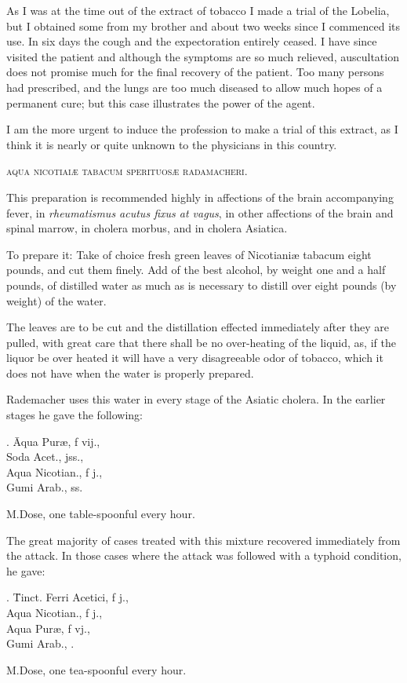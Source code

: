 
As I was at the time out of the extract of tobacco I made a trial of
the Lobelia, but I obtained some from my brother and about two
weeks since I commenced its use. In six days the cough and the expectoration
entirely ceased. I have since visited the patient and although
the symptoms are so much relieved, auscultation does not promise much
for the final recovery of the patient. Too many persons had prescribed,
and the lungs are too much diseased to allow much hopes of a permanent
cure; but this case illustrates the power of the agent.

I am the more urgent to induce the profession to make a trial of
this extract, as I think it is nearly or quite unknown to the physicians
in this country.

\begin{center}\textsc{aqua nicotiaiæ tabacum sperituosæ radamacheri.}\end{center}

This preparation is recommended highly in affections of the brain
accompanying fever, in \emph{rheumatismus acutus fixus at vagus}, in other
affections of the brain and spinal marrow, in cholera morbus, and in
cholera Asiatica.

To prepare it: Take of choice fresh green leaves of Nicotianiæ tabacum
eight pounds, and cut them finely. Add of the best alcohol,
by weight one and a half pounds, of distilled water as much as is
necessary to distill over eight pounds (by weight) of the water.

The leaves are to be cut and the distillation effected immediately
after they are pulled, with great care that there shall be no over-heating
of the liquid, as, if the liquor be over heated it will have a very disagreeable
odor of tobacco, which it does not have when the water is
properly prepared.

Rademacher uses this water in every stage of the Asiatic cholera.
In the earlier stages he gave the following:
  \begin{tabbing}
    \prescription. \= Aqua Puræ, f \ounce vij., \\
      \> Soda Acet., \ounce jss., \\
      \> Aqua Nicotian., f \ounce j., \\
      \> Gumi Arab., \ounce ss. \\
  \end{tabbing}
M.\quad{}Dose, one table-spoonful every hour.


The great majority of cases treated with this mixture recovered
immediately from the attack. In those cases where the attack was followed
with a typhoid condition, he gave:
  \begin{tabbing}
    \prescription. \= Tinct. Ferri Acetici, f \ounce j., \\
      \> Aqua Nicotian., f \ounce j., \\
      \> Aqua Puræ, f \ounce vj., \\
      \> Gumi Arab., \ounce. \\
  \end{tabbing}
M.\quad{}Dose, one tea-spoonful every hour.
\endinput
